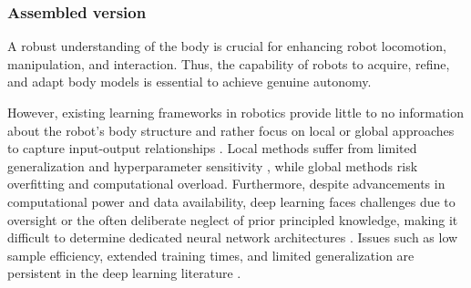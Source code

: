 \documentclass[12pt, a4paper]{article}
\begin{document}

\newpage
\subsubsection*{Assembled version}

A robust understanding of the body is crucial for enhancing robot locomotion, manipulation, and interaction. Thus, the capability of robots to acquire, refine, and adapt body models is essential to achieve genuine autonomy. 

However, existing learning frameworks in robotics provide little to no information about the robot's body structure and rather focus on local or global approaches to capture input-output relationships \cite{NguyenTuong2011Modellearningrobot}. Local methods suffer from limited generalization and hyperparameter sensitivity \cite{Thrun2002Probabilisticrobotics,Goodfellow2016DeepLearning}, while global methods risk overfitting and computational overload. Furthermore, despite advancements in computational power and data availability, deep learning faces challenges due to oversight or the often deliberate neglect of prior principled knowledge, making it difficult to determine dedicated neural network architectures \cite{Baker2017Designingneuralnetwork,Elsken2019Neuralarchitecturesearch}. Issues such as low sample efficiency, extended training times, and limited generalization are persistent in the deep learning literature \cite{Pierson2017Deeplearningrobotics,Suenderhauf2018limitspotentialsdeep}. 
\end{document}
